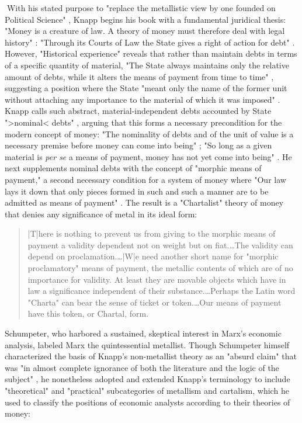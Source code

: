 With his stated purpose to "replace the metallistic view by one founded on Political Science" \autocite[viii]{Knapp1924}, Knapp begins his book with a fundamental juridical thesis: "Money is a creature of law. A theory of money must therefore deal with legal history" \autocite[1]{Knapp1924}: "Through its Courts of Law the State gives a right of action for debt" \autocite[11]{Knapp1924}. However, "Historical experience" reveals that rather than maintain debts in terms of a specific quantity of material, "The State always maintains only the relative amount of debts, while it alters the means of payment from time to time" \autocite[13]{Knapp1924}, suggesting a position where the State "meant only the name of the former unit without attaching any importance to the material of which it was imposed" \autocite[14--5]{Knapp1924}. Knapp calls such abstract, material-independent debts accounted by State ">nominal< debts" \autocite[15]{Knapp1924}, arguing that this forms a necessary precondition for the modern concept of money: "The nominality of debts and of the unit of value is a necessary premise before money can come into being" \autocite[19]{Knapp1924}; "So long as a given material is \emph{per se} a means of payment, money has not yet come into being" \autocite[25--6]{Knapp1924}. He next supplements nominal debts with the concept of "morphic means of payment," a second necessary condition for a system of money where "Our law lays it down that only pieces formed in such and such a manner are to be admitted as means of payment" \autocite[27]{Knapp1924}. The result is a "Chartalist" theory of money that denies any significance of metal in its ideal form:
\blockcquote[30--2]{Knapp1924}{
  |T|here is nothing to prevent us from giving to the morphic means of payment a validity dependent not on weight but on fiat.…The validity can depend on proclamation.…|W|e need another short name for "morphic proclamatory" means of payment, the metallic contents of which are of no importance for validity. At least they are movable objects which have in law a significance independent of their substance.…Perhaps the Latin word "Charta" can bear the sense of ticket or token.…Our means of payment have this token, or Chartal, form.
}
Schumpeter, who harbored a sustained, skeptical interest in Marx's economic analysis, labeled Marx the quintessential metallist. Though Schumpeter himself characterized the basis of Knapp's non-metallist theory as an "absurd claim" that was "in almost complete ignorance of both the literature and the logic of the subject" \autocite*[1057]{Schumpeter1954-gi}, he nonetheless adopted and extended Knapp's terminology to include "theoretical" and "practical" subcategories of metallism and cartalism, which he used to classify the positions of economic analysts according to their theories of money:
